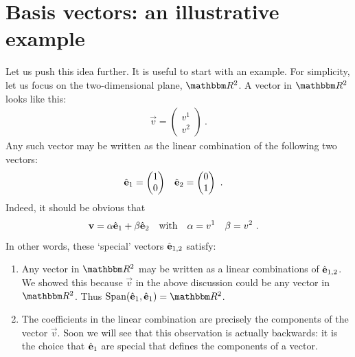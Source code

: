 \section{Basis vectors: an illustrative example}

Let us push this idea further. It is useful to start with an example. For simplicity, let us focus on the two-dimensional plane, $\RR ^2$. A vector in $\RR ^2$ looks like this:
\begin{align}
    \vec{v} =
    \begin{pmatrix}
        v^1 \\ v^2
    \end{pmatrix} \ .
    \label{eq:v:v1:v2}
\end{align}
Any such vector may be written as the linear combination of the following two vectors:
\begin{align}
    {\hat{\mathbf{e}}}_1 &=
    \begin{pmatrix}
        1 \\ 0
    \end{pmatrix}
    &
    {\hat{\mathbf{e}}}_2 &=
    \begin{pmatrix}
        0 \\ 1
    \end{pmatrix} \ .
\end{align}
Indeed, it should be obvious that 
\begin{align}
    \mathbf{v} &= \alpha {\hat{\mathbf{e}}}_1 + \beta {\hat{\mathbf{e}}}_2
    & \textnormal{with}&
    &\alpha &= v^1
    &\beta &= v^2 \ .
    \label{eq:natural:cartesian:basis}
\end{align}
In other words, these `special' vectors ${\hat{\mathbf{e}}}_{1,2}$ satisfy:
\begin{enumerate}
    \item Any vector in $\RR ^2$ may be written as a linear combinations of ${\hat{\mathbf{e}}}_{1,2}$. We showed this because $\vec{v}$ in the above discussion could be any vector in $\RR ^2$. Thus $\text{Span}({\bas{e}}_{1},{\bas{e}}_{1})=\RR ^2$.
    \item The coefficients in the linear combination are precisely the components of the vector $\vec{v}$. Soon we will see that this observation is actually backwards: it is the choice that ${\hat{\mathbf{e}}}_{1}$ are special that defines the components of a vector.
\end{enumerate}


